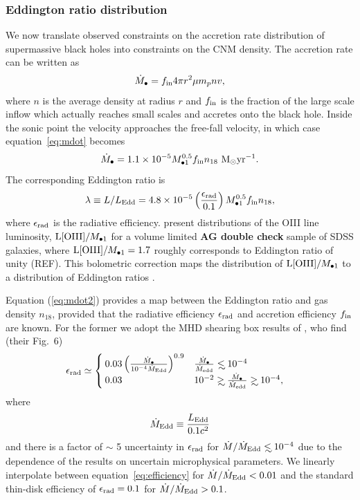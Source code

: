 \documentclass[usenatbib,fleqn]{mnras}
\newcommand\lsim{\mathrel{\rlap{\lower4pt\hbox{\hskip1pt$\sim$}}
    \raise1pt\hbox{$<$}}}
\newcommand\gsim{\mathrel{\rlap{\lower4pt\hbox{\hskip1pt$\sim$}}
    \raise1pt\hbox{$>$}}}
\newcommand{\Mbh}[1][]{M_{\bullet1}}
\newcommand{\Msun}{{\rm M_\odot}}
\begin{document}
\subsubsection{Eddington ratio distribution}
We now translate observed constraints on the accretion
rate distribution of supermassive black holes into constraints on the
CNM density.  The accretion rate can be written as
\begin{equation}
\dot{M}_{\bullet} = f_{\rm in} 4 \pi r^2 \mu m_p n v,
\label{eq:mdot}
\end{equation}
where $n$ is the average density at radius $r$ and $f_{\rm in}$ is the
fraction of the large scale inflow which actually reaches small scales
and accretes onto the black hole.  Inside the sonic point the velocity
approaches the free-fall velocity, in which case
equation~\eqref{eq:mdot} becomes
\begin{equation}
  \dot{M}_{\bullet} = 1.1\times 10^{-5} \Mbh[,7]^{0.5} f_{\rm in}
  n_{18} \,\,\Msun {\rm yr}^{-1}.
\label{eq:mdot2}
\end{equation}
%
The corresponding Eddington ratio is
\begin{equation}
  \lambda\equiv L/L_{\rm Edd} = 4.8 \times 10^{-5}
  \left(\frac{\epsilon_{\rm rad}}{0.1}\right) \Mbh[,7]^{0.5} f_{\rm in}
  n_{18},
\label{eq:n18Edd}
\end{equation}
%
where $\epsilon_{\rm rad}$ is the radiative
efficiency. \citet{Kauffmann&Heckman2009} present distributions of the
OIII line luminosity, ${\rm L[OIII]}/\Mbh$ for a volume limited {\bf
  AG double check} sample of SDSS galaxies, where ${\rm
  L[OIII]}/\Mbh=1.7$ roughly corresponds to Eddington ratio of unity
(REF).  This bolometric correction maps the distribution of ${\rm
  L[OIII]}/\Mbh$ to a distribution of Eddington ratios
\citep{Kauffmann&Heckman2009}.

Equation (\ref{eq:mdot2}) provides a map between the Eddington ratio
and gas density $n_{18}$, provided that the radiative efficiency
$\epsilon_{\rm rad}$ and accretion efficiency $f_{\rm in}$ are known.
For the former we adopt the MHD shearing box results of
\citet{Sharma+2007}, who find (their Fig.~6)
\begin{align}
&\epsilon_{\rm rad} \simeq 
\begin{cases}
  0.03 \left(\frac{\dot{M}_{\bullet}}{10^{-4}\dot{M}_{\rm Edd}}\right)^{0.9} & \frac{\dot{M}_{\bullet}}{\dot{M}_{\rm edd}} \lsim 10^{-4} \\
 0.03 &  10^{-2} \gsim \frac{\dot{M}_{\bullet}}{\dot{M}_{\rm edd}}
 \gsim  10^{-4},
\end{cases}
\label{eq:efficiency}
\end{align}
where
\begin{equation} 
 \dot{M}_{\rm Edd} \equiv \frac{L_{\rm Edd}}{0.1 c^2} 
\end{equation}
%
and
there is a factor of $\sim$ 5 uncertainty in $\epsilon_{\rm rad}$ for
$\dot{M}/\dot{M}_{\rm Edd}\lsim 10^{-4}$ due to the dependence of the
results on uncertain microphysical parameters.  We linearly
interpolate between equation~\eqref{eq:efficiency} for
$\dot{M}/\dot{M}_{\rm Edd}<0.01$ and the standard thin-disk efficiency
of $\epsilon_{\rm rad}=0.1$ for $\dot{M}/\dot{M}_{\rm Edd}>0.1$.
\end{document}
